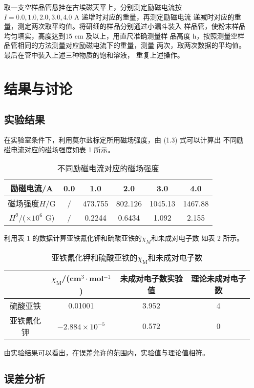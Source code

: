 \documentclass[12pt]{ctexart}
\numberwithin{equation}{section}
\begin{document}
取一支空样品管悬挂在古埃磁天平上，分别测定励磁电流按
$I = 0.0, 1.0, 2.0, 3.0, 4.0$ A 递增时对应的重量，再测定励磁电流
递减时对应的重量，测定两次取平均值。将研细的样品分别通过小漏斗装入
样品管，使粉末样品均匀填实，高度达到15 cm 及以上，用直尺准确测量样
品高度 h，按照测量空样品管相同的方法测量对应励磁电流下的重量，测量
两次，取两次数据的平均值。最后在管中装入上述三种物质的饱和溶液，
重复上述操作。

\section{结果与讨论}
\subsection{实验结果}

在实验室条件下，利用莫尔盐标定所用磁场强度，由 (1.3) 式可以计算出
不同励磁电流对应的磁场强度如表 1 所示。

\begin{longtable}{c|ccccc}
    \caption{不同励磁电流对应的磁场强度} \\
    \hline
    励磁电流/A & 0.0 & 1.0 & 2.0 & 3.0 & 4.0 \\
    \hline
    磁场强度$H/$G & / &
        473.755 & 802.126 & 1045.13 & 1467.88 \\
    \hline
    $H^2$/($\times 10^{6}$ G) & / &
        0.2244 & 0.6434 & 1.092 & 2.155 \\
    \hline
\end{longtable}

利用表 1 的数据计算亚铁氰化钾和硫酸亚铁的$\chi_M$和未成对电子数
如表 2 所示。

\begin{longtable}{c|c|c|c}
    \caption{亚铁氰化钾和硫酸亚铁的$\chi_\text{M}$和未成对电子数} \\
    \hline
     & $\chi_\text{M}$/(cm$^3\cdot$mol$^{-1}$) &
        未成对电子数实验值 & 理论未成对电子数 \\
    \hline
    硫酸亚铁 & 0.01001 & 3.952 & 4 \\
    \hline
    亚铁氰化钾 & $-2.884\times 10^{-5}$ & 0.572 & 0 \\
    \hline
\end{longtable}

由实验结果可以看出，在误差允许的范围内，实验值与理论值相符。

\subsection{误差分析}
\end{document}
